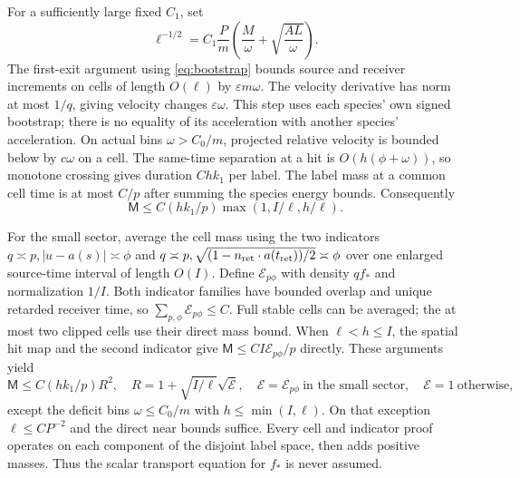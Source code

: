 \documentclass[11pt]{article}
\theoremstyle{remark}\newtheorem{remark}[theorem]{Remark}
\numberwithin{equation}{section}
\begin{document}
For a sufficiently large fixed $C_1$, set
\begin{equation}\label{eq:lambda}
 \ell^{-1/2}=C_1\frac Pm
       \left(\frac M\omega+\sqrt{\frac{AL}{\omega}}\right).
\end{equation}
The first-exit argument using \eqref{eq:bootstrap} bounds source and receiver
increments on cells of length $O(\ell)$ by $\varepsilon m\omega$.
The velocity derivative has norm at most $1/q$, giving velocity changes
$\varepsilon\omega$. This step uses each species' own signed bootstrap;
there is no equality of its acceleration with another species' acceleration.
On actual bins $\omega>C_0/m$, projected relative velocity is bounded
below by $c\omega$ on a cell. The same-time separation at a hit is
$O(h(\phi+\omega))$, so monotone crossing gives duration $Chk_1$ per
label. The label mass at a common cell time is at most $C/p$ after
summing the species energy bounds. Consequently
\begin{equation}\label{eq:cell}
 \mathsf M\le C(hk_1/p)\max(1,I/\ell,h/\ell).
\end{equation}

For the small sector, average the cell mass using the two indicators
$q\asymp p,|u-a(s)|\asymp\phi$ and
$q\asymp p,\sqrt{(1-n_{\rm ret}\cdot a(t_{\rm ret}))/2}\asymp\phi$
over one enlarged source-time interval of length $O(I)$.
Define $\mathcal E_{p\phi}$ with density $qf_*$ and normalization $1/I$.
Both indicator families have bounded overlap and unique retarded receiver
time, so $\sum_{p,\phi}\mathcal E_{p\phi}\le C$.
Full stable cells can be averaged; the at most two clipped cells use their
direct mass bound. When $\ell<h\le I$, the spatial hit map and the second
indicator give $\mathsf M\le CI\mathcal E_{p\phi}/p$ directly.
These arguments yield
\begin{equation}\label{eq:refined}
 \mathsf M\le C(hk_1/p)R^2,\quad
 R=1+\sqrt{I/\ell}\sqrt{\mathcal E},\quad
 \mathcal E=\mathcal E_{p\phi}\ \text{in the small sector},\quad
 \mathcal E=1\ \text{otherwise},
\end{equation}
except the deficit bins $\omega\le C_0/m$ with $h\le\min(I,\ell)$.
On that exception $\ell\le CP^{-2}$ and the direct near bounds suffice.
Every cell and indicator proof operates on each component of the disjoint
label space, then adds positive masses. Thus the scalar transport equation
for $f_*$ is never assumed.
\end{document}
